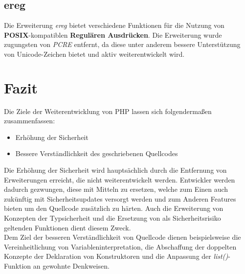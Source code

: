     \subsection{ereg}\label{ereg}
    Die Erweiterung \textit{ereg} bietet verschiedene Funktionen für die Nutzung von \textbf{POSIX}-kompatiblen \textbf{Regulären Ausdrücken}. Die Erweiterung wurde
    zugungsten von \textit{\acs{PCRE}} entfernt, da diese unter anderem bessere Unterstützung von Unicode-Zeichen bietet und aktiv weiterentwickelt wird. \cite{popov_php:_2014}

\section{Fazit}
Die Ziele der Weiterentwicklung von \acs{PHP} lassen sich folgendermaßen zusammenfassen:
\begin{itemize}
    \item Erhöhung der Sicherheit
    \item Bessere Verständlichkeit des geschriebenen Quellcodes
\end{itemize}  
Die Erhöhung der Sicherheit wird hauptsächlich durch die Entfernung von Erweiterungen erreicht, die nicht weiterentwickelt werden. Entwickler werden dadurch gezwungen,
diese mit Mitteln zu ersetzen, welche zum Einen auch zukünftig mit Sicherheitsupdates versorgt werden und zum Anderen Features bieten um den Quellcode zusätzlich
zu härten. Auch die Erweiterung von Konzepten der Typsicherheit und die Ersetzung von als Sicherheitsrisiko geltenden Funktionen dient diesem Zweck.\\
Dem Ziel der besseren Verständlichkeit von Quellcode dienen beispielsweise die Vereinheitlichung von Variableninterpretation, die Abschaffung der doppelten Konzepte
der Deklaration von Konstruktoren und die Anpassung der \textit{list()}-Funktion an gewohnte Denkweisen.\\
